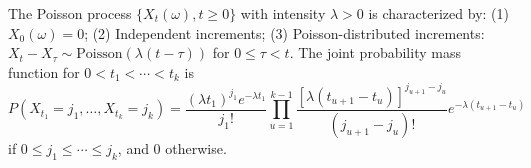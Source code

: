 The Poisson process $\{X_t(\omega), t \geq 0\}$ with intensity $\lambda > 0$ is characterized by:
(1) $X_0(\omega) = 0$;
(2) Independent increments;
(3) Poisson-distributed increments: $X_t - X_\tau \sim \mathrm{Poisson}(\lambda(t - \tau))$ for $0 \leq \tau < t$.
The joint probability mass function for $0 < t_1 < \cdots < t_k$ is
$$P(X_{t_1} = j_1, \ldots, X_{t_k} = j_k) = \frac{(\lambda t_1)^{j_1} e^{-\lambda t_1}}{j_1!} \prod_{u=1}^{k-1} \frac{[\lambda(t_{u+1} - t_u)]^{j_{u+1} - j_u}}{(j_{u+1} - j_u)!} e^{-\lambda(t_{u+1} - t_u)}$$
if $0 \leq j_1 \leq \cdots \leq j_k$, and 0 otherwise.
